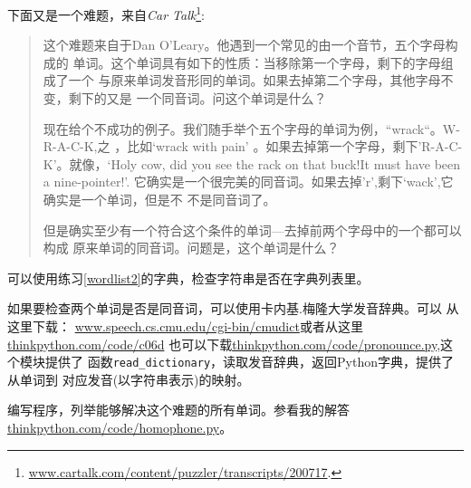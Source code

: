 \begin{ex}

下面又是一个难题，来自{\em Car
	Talk}\footnote{\url{www.cartalk.com/content/puzzler/transcripts/200717}.}:


\begin{quote}
这个难题来自于Dan O'Leary。他遇到一个常见的由一个音节，五个字母构成的
单词。这个单词具有如下的性质：当移除第一个字母，剩下的字母组成了一个
与原来单词发音形同的单词。如果去掉第二个字母，其他字母不变，剩下的又是
一个同音词。问这个单词是什么？

现在给个不成功的例子。我们随手举个五个字母的单词为例，“wrack“。W-R-A-C-K,之
，比如`wrack with pain' 。如果去掉第一个字母，剩下'R-A-C-K'。就像，`Holy
cow, did you see the rack on that buck!It must have been a nine-pointer!'.
它确实是一个很完美的同音词。如果去掉'r',剩下`wack',它确实是一个单词，但是不
不是同音词了。

但是确实至少有一个符合这个条件的单词---去掉前两个字母中的一个都可以构成
原来单词的同音词。问题是，这个单词是什么？
\end{quote}


可以使用练习\ref{wordlist2}的字典，检查字符串是否在字典列表里。

如果要检查两个单词是否是同音词，可以使用卡内基.梅隆大学发音辞典。可以
从这里下载：
\url{www.speech.cs.cmu.edu/cgi-bin/cmudict}或者从这里\url{thinkpython.com/code/c06d} 
也可以下载\url{thinkpython.com/code/pronounce.py},这个模块提供了
函数\verb"read_dictionary"，读取发音辞典，返回Python字典，提供了从单词到
对应发音(以字符串表示)的映射。

编写程序，列举能够解决这个难题的所有单词。参看我的解答\url{thinkpython.com/code/homophone.py}。


\end{ex}




























